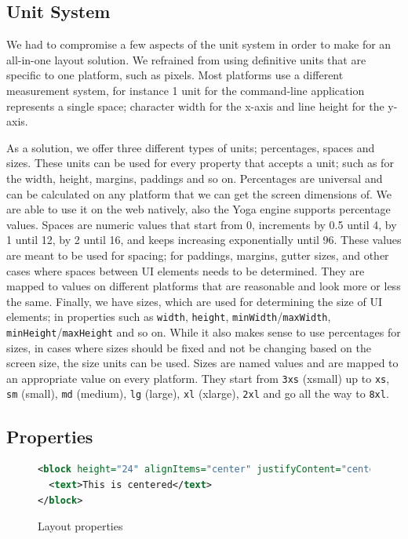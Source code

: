 \subsection{Unit System}

We had to compromise a few aspects of the unit system in order to make for an all-in-one layout solution. We refrained from using definitive units that are specific to one platform, such as pixels. Most platforms use a different measurement system, for instance 1 unit for the command-line application represents a single space; character width for the x-axis and line height for the y-axis.

As a solution, we offer three different types of units; percentages, spaces and sizes. These units can be used for every property that accepts a unit; such as for the width, height, margins, paddings and so on. Percentages are universal and can be calculated on any platform that we can get the screen dimensions of. We are able to use it on the web natively, also the Yoga engine supports percentage values. Spaces are numeric values that start from 0, increments by 0.5 until 4, by 1 until 12, by 2 until 16, and keeps increasing exponentially until 96. These values are meant to be used for spacing; for paddings, margins, gutter sizes, and other cases where spaces between UI elements needs to be determined. They are mapped to values on different platforms that are reasonable and look more or less the same. Finally, we have sizes, which are used for determining the size of UI elements; in properties such as \texttt{width}, \texttt{height}, \texttt{minWidth}/\texttt{maxWidth}, \texttt{minHeight}/\texttt{maxHeight} and so on. While it also makes sense to use percentages for sizes, in cases where sizes should be fixed and not be changing based on the screen size, the size units can be used. Sizes are named values and are mapped to an appropriate value on every platform. They start from \texttt{3xs} (xsmall) up to \texttt{xs}, \texttt{sm} (small), \texttt{md} (medium), \texttt{lg} (large), \texttt{xl} (xlarge), \texttt{2xl} and go all the way to \texttt{8xl}.

\subsection{Properties}

\begin{figure}[H]
\begin{minipage}{\linewidth}
\begin{lstlisting}[language=xml]
<block height="24" alignItems="center" justifyContent="center">
  <text>This is centered</text>
</block>
\end{lstlisting}
\end{minipage}
\caption{Layout properties}%
\label{fig:layout_props_example}%
\end{figure}

